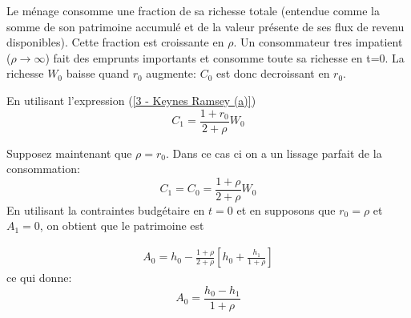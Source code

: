 \documentclass[a4paper,11pt]{article}
\begin{document}
\begin{enumerate}
Le ménage consomme une fraction de sa richesse totale (entendue
comme la somme de son patrimoine accumulé et de la valeur présente
de ses flux de revenu disponibles). Cette fraction est croissante en $\rho$. Un consommateur tres impatient ($\rho \to \infty$) fait des emprunts importants et consomme toute sa richesse en t=0. La richesse $W_0$ baisse quand $r_0$ augmente:  $C_{0}$ est donc decroissant en $r_0$.  


En utilisant l'expression (\ref{3 - Keynes Ramsey (a)}) 
\begin{equation}
C_{1}= \frac{1+r_0}{2+\rho} W_0  \label{2 - CBI9}
\end{equation}

Supposez maintenant que $\rho=r_0.$ Dans ce cas ci on a un lissage parfait de la consommation: 
\begin{equation}
C_{1}=C_0= \frac{1+\rho}{2+\rho} W_0  \label{2 - CBI91}
\end{equation}
En utilisant la contraintes budgétaire en $t=0$ et en supposons que $r_0=\rho$ et $A{_1}=0$, on obtient que le patrimoine est

\begin{align*}
A_{0}= h_0 -  \frac{1+\rho}{2+\rho} \left[h_0+\frac{h_1}{1+\rho}\right] 
\end{align*}%
ce qui donne: 
\begin{equation}\label{asset}
A_{0}= \frac{h_0-h_1}{1+\rho} 
\end{equation}


\end{enumerate}
\end{document}
